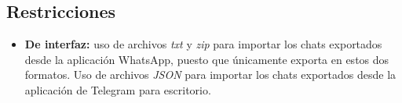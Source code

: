 \subsection{Restricciones}

\begin{itemize}
	\item \textbf{De interfaz:} uso de archivos \textit{txt} y \textit{zip} para importar los chats exportados desde la aplicación WhatsApp, puesto que únicamente exporta en estos dos formatos. Uso de archivos \textit{JSON} para importar los chats exportados desde la aplicación de Telegram para escritorio.
\end{itemize}










